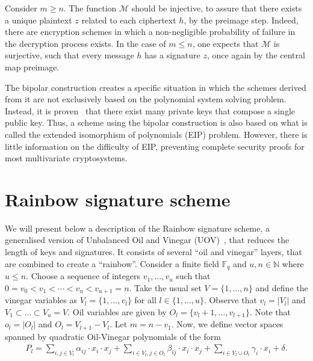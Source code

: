 \documentclass[openright, draft, 10pt]{report}
\begin{document}
Consider $m \geq n$. The function $\mathcal{M}$ should be injective, to assure that there exists a unique plaintext $z$ related to each ciphertext $h$, by the preimage step. Indeed, there are encryption schemes in which a non-negligible probability of failure in the decryption process exists. In the case of $m \leq n$, one expects that $\mathcal{M}$ is surjective, such that every message $h$ has a signature $z$, once again by the central map preimage.

The bipolar construction creates a specific situation in which the schemes derived from it are not exclusively based on the polynomial system solving problem. Instead, it is proven~\cite{Wolf:201104:article} that there exist many private keys that compose a single public key. Thus, a scheme using the bipolar construction is also based on what is called the extended isomorphism of polynomials (EIP) problem. However, there is little information on the difficulty of EIP, preventing complete security proofs for most multivariate cryptosystems.

\section{Rainbow signature scheme}\label{sec:scheme}

We will present below a description of the Rainbow signature scheme, a
generalised version of Unbalanced Oil and Vinegar
(UOV)~\cite{Kipnis:199904:inproc}, that reduces the length of keys and
signatures. It consists of several ``oil and vinegar'' layers, that are
combined to create a ``rainbow''. Consider a finite field $\mathbb{F}_{q}$ and
$u, n \in \mathbb{N}$ where $u \leq n$. Choose a sequence of integers
$v_{1}, \dots, v_{u}$ such that
$0 = v_{0} < v_{1} < \cdots < v_{u} < v_{u + 1} = n$. Take the usual set
$V = \{1, \dots, n\}$ and define the vinegar variables as
$V_{l} = \{1, \dots, v_{l}\}$ for all $l \in \{1, \dots, u\}$. Observe that
$v_{l} = |V_{l}|$ and $V_{1} \subset \dots \subset V_{u} = V$. Oil variables
are given by $O_{l} = \{v_{l} + 1, \dots, v_{l + 1}\}$. Note that
$o_{l} = |O_{l}|$ and $O_{l} = V_{l + 1} - V_{l}$. Let $m = n - v_{1}$. Now,
we define vector spaces spanned by quadratic Oil-Vinegar polynomials of the
form
\begin{align}
  P_{l} = \sum_{i, j \in V_{l}} \alpha_{ij} \cdot x_{i} \cdot x_{j}
    + \sum_{i \in V_{l}, j \in O_{l}} \beta_{ij} \cdot x_{i} \cdot x_{j}
    + \sum_{i \in V_{l} \cup O_{l}} \gamma_{i} \cdot x_{i} + \delta.
\end{align}
\end{document}
